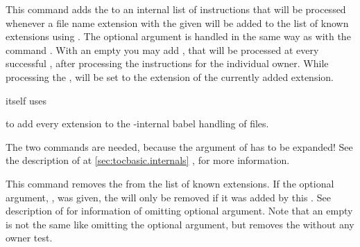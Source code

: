 \begin{Declaration}
\end{Declaration}
This command adds the  to an internal list of instructions
that will be processed whenever a file name extension with the given
 will be added to the list of known extensions using
.  The optional argument is handled in the same way as
with the command . With an empty  you may
add , that will be processed at every successful
, after processing the instructions for the individual
owner.  While processing the ,
 will be set to
the extension of the currently added extension.
\begin{Example}
   itself uses
\begin{lstcode}
  \AtAddToTocList[]{%
    \expandafter\tocbasic@extend@babel
    \expandafter{\@currext}%
  }
\end{lstcode}
  to add every extension to the -internal babel handling of
  files.
\end{Example}

The two  commands are needed, because the argument of
 has to be expanded!  See the description of
 at \autoref{sec:tocbasic.internals}%
,  for more information.%
\EndIndexGroup


\begin{Declaration}
\end{Declaration}
This command removes the  from the list of known extensions.
If the optional argument, , was given, the 
will only be removed if it was added by this . See description of
 for information of omitting optional argument. Note that
an empty  is not the same like omitting the optional argument,
but removes the  without any owner test.%
\EndIndexGroup


